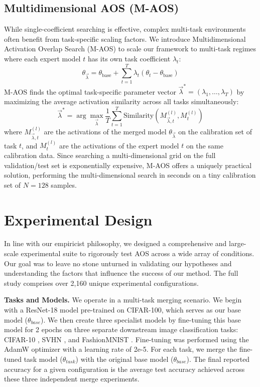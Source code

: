 \documentclass{article}
\theoremstyle{plain}
\theoremstyle{definition}
\theoremstyle{remark}
\begin{document}
\subsection{Multidimensional AOS (M-AOS)}
While single-coefficient searching is effective, complex multi-task environments often benefit from task-specific scaling factors. We introduce Multidimensional Activation Overlap Search (M-AOS) to scale our framework to multi-task regimes where each expert model $t$ has its own task coefficient $\lambda_t$:
\begin{equation}
\theta_{\vec{\lambda}} = \theta_{\text{base}} + \sum_{t=1}^T \lambda_t (\theta_t - \theta_{\text{base}})
\end{equation}
M-AOS finds the optimal task-specific parameter vector $\vec{\lambda}^* = (\lambda_1, \dots, \lambda_T)$ by maximizing the average activation similarity across all tasks simultaneously:
\begin{equation}
\vec{\lambda}^* = \arg\max_{\vec{\lambda}} \frac{1}{T} \sum_{t=1}^T \text{Similarity}(M_{\vec{\lambda}, t}^{(l)}, M_{t}^{(l)})
\end{equation}
where $M_{\vec{\lambda}, t}^{(l)}$ are the activations of the merged model $\theta_{\vec{\lambda}}$ on the calibration set of task $t$, and $M_t^{(l)}$ are the activations of the expert model $t$ on the same calibration data. Since searching a multi-dimensional grid on the full validation/test set is exponentially expensive, M-AOS offers a uniquely practical solution, performing the multi-dimensional search in seconds on a tiny calibration set of $N=128$ samples.

\section{Experimental Design}

In line with our empiricist philosophy, we designed a comprehensive and large-scale experimental suite to rigorously test AOS across a wide array of conditions. Our goal was to leave no stone unturned in validating our hypotheses and understanding the factors that influence the success of our method. The full study comprises over 2,160 unique experimental configurations.

\textbf{Tasks and Models.} We operate in a multi-task merging scenario. We begin with a ResNet-18 model \citep{he2016deep} pre-trained on CIFAR-100, which serves as our base model ($\theta_{base}$). We then create three specialist models by fine-tuning this base model for 2 epochs on three separate downstream image classification tasks: CIFAR-10 \citep{krizhevsky2009learning}, SVHN \citep{netzer2011reading}, and FashionMNIST \citep{xiao2017fashion}. Fine-tuning was performed using the AdamW optimizer \citep{loshchilov2017decoupled} with a learning rate of 2e-5. For each task, we merge the fine-tuned task model ($\theta_{task}$) with the original base model ($\theta_{base}$). The final reported accuracy for a given configuration is the average test accuracy achieved across these three independent merge experiments.
\end{document}
